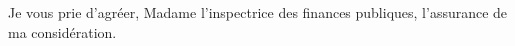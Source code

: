 \documentclass[11pt]{lettre}
\begin{document}
\begin{letter}
Je vous prie d'agréer, Madame l'inspectrice des finances publiques, l'assurance de ma considération.

\vspace{2cm}

\hspace{10cm}\begin{minipage}{6cm}
\end{minipage}

\thispagestyle{empty}
\end{letter}
\end{document}
